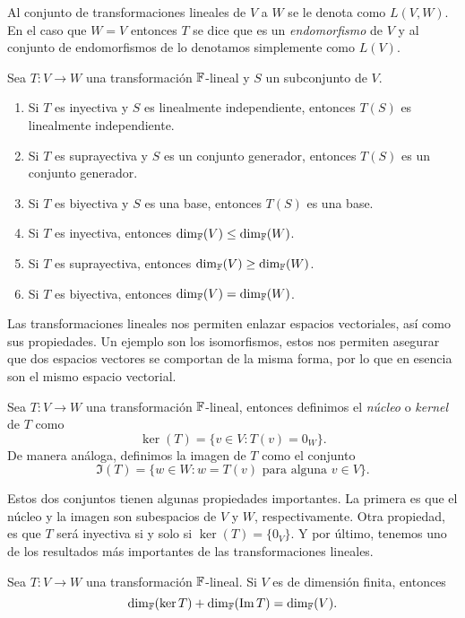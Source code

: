 Al conjunto de transformaciones lineales de $V$ a $W$ se le denota como $L(V,W)$. En el caso que $W = V$ entonces $T$ se dice que es un \emph{endomorfismo} de $V$ y al conjunto de endomorfismos de lo denotamos simplemente como $L(V)$.

\begin{teor}
  Sea $T\colon V \to W$ una transformación $\mathbb{F}$-lineal y $S$ un subconjunto de $V$.
  \begin{enumerate}
    \item Si $T$ es inyectiva y $S$ es linealmente independiente, entonces $T(S)$ es linealmente independiente.
    \item Si $T$ es suprayectiva y $S$ es un conjunto generador, entonces $T(S)$ es un conjunto generador.
    \item Si $T$ es biyectiva y $S$ es una base, entonces $T(S)$ es una base.
    \item Si $T$ es inyectiva, entonces $\dim_{\mathbb{F}} (V) \leq \dim_{\mathbb{F}}(W)$.
    \item Si $T$ es suprayectiva, entonces $\dim_{\mathbb{F}} (V) \geq \dim_{\mathbb{F}}(W)$.
    \item Si $T$ es biyectiva, entonces $\dim_{\mathbb{F}} (V) = \dim_{\mathbb{F}}(W)$.
  \end{enumerate}
\end{teor}

Las transformaciones lineales nos permiten enlazar espacios vectoriales, así como sus propiedades. Un ejemplo son los isomorfismos, estos nos permiten asegurar que dos espacios vectores se comportan de la misma forma, por lo que en esencia son el mismo espacio vectorial.

\begin{defi}
  Sea $T\colon V \to W$ una transformación $\mathbb{F}$-lineal, entonces definimos el \emph{núcleo} o \emph{kernel}  de $T$ como
    \[ \ker(T) = \{ v \in V : T(v) = 0_W \}.\]
  De manera análoga, definimos la imagen de $T$ como el conjunto
    \[ \Im(T) = \{w \in W : w = T(v) \text{ para alguna } v \in V \}. \]
\end{defi}

Estos dos conjuntos tienen algunas propiedades importantes. La primera es que el núcleo y la imagen son subespacios de $V$ y $W$, respectivamente. Otra propiedad, es que $T$ será inyectiva si y solo si $\ker(T) = \{0_V\}$. Y por último, tenemos uno de los resultados más importantes de las transformaciones lineales.
\begin{teor}
  Sea $T \colon V \to W$ una transformación $\mathbb{F}$-lineal. Si $V$ es de dimensión finita, entonces
    \[  \dim_{\mathbb{F}}( \ker T )  + \dim_{\mathbb{F}}( \operatorname{Im} T) = \dim_{\mathbb{F}} (V). \]
\end{teor}




